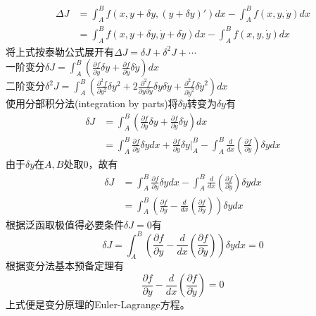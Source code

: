 \documentclass[12pt]{article}
\numberwithin{equation}{section}
\begin{document}
        \begin{equation*}
            \begin{aligned}
                \Delta J&=\int_A^Bf(x,y+\delta y,(y+\delta y)')dx-\int_A^Bf(x,y,\dot{y})dx\\
                &=\int_A^Bf(x,y+\delta y,\dot{y}+\delta \dot{y})dx-\int_A^Bf(x,y,\dot{y})dx
            \end{aligned}
        \end{equation*}
        将上式按泰勒公式展开有$\Delta J=\delta J+\delta^2J+\cdots$\\
        一阶变分$\delta J=\int_A^B\left(\frac{\partial f}{\partial y}\delta y +\frac{\partial f}{\partial \dot{y}}\delta\dot{y}\right)dx$\\
        二阶变分$\delta^2J=\int_A^B \left( \frac{\partial^2f}{\partial y^2}\delta y^2+
        2\frac{\partial^2f}{\partial y\partial\dot{y}}\delta y\delta\dot{y}+
        \frac{\partial^2f}{\partial\dot{y}^2}\delta\dot{y}^2 \right)dx$\\
        使用分部积分法(integration by parts)将$\delta\dot{y}$转变为$\delta y$有
        \begin{equation*}
            \begin{aligned}
                \delta J&=\int_A^B\left(\frac{\partial f}{\partial y}\delta y +\frac{\partial f}{\partial \dot{y}}\delta\dot{y}\right)dx\\
                &=\int_A^B\frac{\partial f}{\partial y}\delta ydx+\frac{\partial f}{\partial \dot{y}}\delta y\Big|_A^B-
                \int_A^B\frac{d}{dx}\left(\frac{\partial f}{\partial \dot{y}}\right)\delta ydx
            \end{aligned}
        \end{equation*}
        由于$\delta y$在$A,B$处取0，故有
        \begin{equation*}
            \begin{aligned}
                \delta J&=\int_A^B\frac{\partial f}{\partial y}\delta ydx-
                \int_A^B\frac{d}{dx}\left(\frac{\partial f}{\partial \dot{y}}\right)\delta ydx\\
                &=\int_A^B\left(\frac{\partial f}{\partial y}-\frac{d}{dx}\left(\frac{\partial f}{\partial \dot{y}}\right)\right)\delta ydx
            \end{aligned}
        \end{equation*}
        根据泛函取极值得必要条件$\delta J=0$有
        \begin{equation}
            \delta J=\int_A^B\left(\frac{\partial f}{\partial y}-\frac{d}{dx}\left(\frac{\partial f}{\partial \dot{y}}\right)\right)\delta ydx=0
        \end{equation}
        根据变分法基本预备定理有
        \begin{equation}\label{E-L}
            \frac{\partial f}{\partial y}-\frac{d}{dx}\left(\frac{\partial f}{\partial \dot{y}}\right)=0
        \end{equation}
        上式便是变分原理的Euler-Lagrange方程。
        
\end{document}
